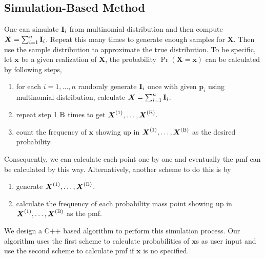 \documentclass[12pt]{article}
\newcommand{\Ivec}{{\boldsymbol{\rm I}}}
\newcommand{\pvec}{\boldsymbol{p}}
\newcommand{\Xvec}{\boldsymbol{X}}
\newcommand{\xvec}{\boldsymbol{x}}
\begin{document}
\subsection{Simulation-Based Method}
One can simulate $\Ivec_i$ from multinomial distribution and then compute $\Xvec = \sum_{i=1}^{n}\Ivec_i$. Repeat this many times to generate enough samples for $\Xvec$. Then use the sample distribution to approximate the true distribution. To be specific, let $\xvec$ be a given realization of $\Xvec$, the probability $\Pr(\Xvec=\xvec)$ can be calculated by following steps,
\begin{enumerate}[Step 1]
    \item for each $i=1,\dots,n$ randomly generate $\Ivec_i$ once with given $\pvec_i$ using multinomial distribution, calculate $\Xvec = \sum_{i=1}^{n}\Ivec_i$.
    \item repeat step 1 $\rm B$ times to get $\Xvec^{(1)},\dots,\Xvec^{(\rm B)}$.
    \item count the frequency of $\xvec$ showing up in $\Xvec^{(1)},\dots,\Xvec^{(\rm B)}$ as the desired probability.
\end{enumerate}
Consequently, we can calculate each point one by one and eventually the pmf can be calculated by this way. Alternatively, another scheme to do this is by
\begin{enumerate}[Step 1]
	\item generate $\Xvec^{(1)},\dots,\Xvec^{(\rm B)}$.
	\item calculate the frequency of each probability mass point showing up in $\Xvec^{(1)},\dots,\Xvec^{(\rm B)}$ as the pmf.
\end{enumerate}

We design a C++ based algorithm to perform this simulation process. Our algorithm uses the first scheme to calculate probabilities of $\xvec$s as user input  and use the second scheme to calculate pmf if $\xvec$ is no specified.
\end{document}
